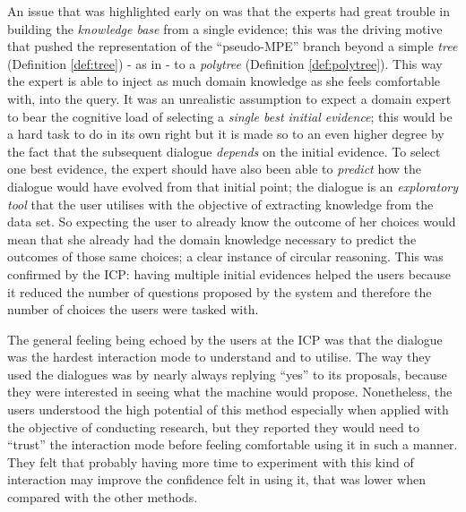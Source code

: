 An issue that was highlighted early on was that the experts had great trouble in building the \textit{knowledge base} from a single evidence; this was the driving motive that pushed the representation of the \enquote{pseudo-MPE} branch beyond a simple \textit{tree} (Definition \ref{def:tree}) - as in \citep{Butz2018} - to a \textit{polytree} (Definition \ref{def:polytree}).
This way the expert is able to inject as much domain knowledge as she feels comfortable with, into the query.
It was an unrealistic assumption to expect a domain expert to bear the cognitive load of selecting a \textit{single best initial evidence}; this would be a hard task to do in its own right but it is made so to an even higher degree by the fact that the subsequent dialogue \textit{depends} on the initial evidence.
To select one best evidence, the expert should have also been able to \textit{predict} how the dialogue would have evolved from that initial point; the dialogue is an \textit{exploratory tool} that the user utilises with the objective of extracting knowledge from the data set.
So expecting the user to already know the outcome of her choices would mean that she already had the domain knowledge necessary to predict the outcomes of those same choices; a clear instance of circular reasoning.
This was confirmed by the ICP: having multiple initial evidences helped the users because it reduced the number of questions proposed by the system and therefore the number of choices the users were tasked with.

The general feeling being echoed by the users at the ICP was that the dialogue was the hardest interaction mode to understand and to utilise.
The way they used the dialogues was by nearly always replying \enquote{yes} to its proposals, because they were interested in seeing what the machine would propose.
Nonetheless, the users understood the high potential of this method especially when applied with the objective of conducting research, but they reported they would need to \enquote{trust} the interaction mode before feeling comfortable using it in such a manner.
They felt that probably having more time to experiment with this kind of interaction may improve the confidence felt in using it, that was lower when compared with the other methods.


